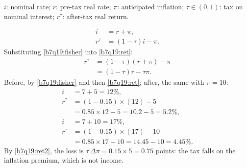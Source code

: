 \begin{sol}
\begin{notacao}
\item $i$: nominal rate; $r$: pre-tax real rate; $\pi$: anticipated inflation; $\tau\in(0,1)$: tax on nominal interest; $r^\tau$: after-tax real return.
\end{notacao}
\begin{align}
i&=r+\pi, \label{b7q19:fisher}\\
r^\tau&=(1-\tau)i-\pi. \label{b7q19:ret}
\end{align}
Substituting \eqref{b7q19:fisher} into \eqref{b7q19:ret}:
\begin{align}
r^\tau&=(1-\tau)(r+\pi)-\pi\nonumber\\
&=(1-\tau)r-\tau\pi. \label{b7q19:ret2}
\end{align}
Before, by \eqref{b7q19:fisher} and then \eqref{b7q19:ret}; after, the same with $\pi=10$:
\begin{align*}
i&=7+5=12\%,\\
r^\tau&=(1-0.15)\times(12)-5\\
&=0.85\times12-5=10.2-5=5.2\%,\\
i&=7+10=17\%,\\
r^\tau&=(1-0.15)\times(17)-10\\
&=0.85\times17-10=14.45-10=4.45\%.
\end{align*}
By \eqref{b7q19:ret2}, the loss is $\tau\,\Delta\pi=0.15\times5=0.75$ points: the tax falls on the inflation premium, which is not income.
\end{sol}

